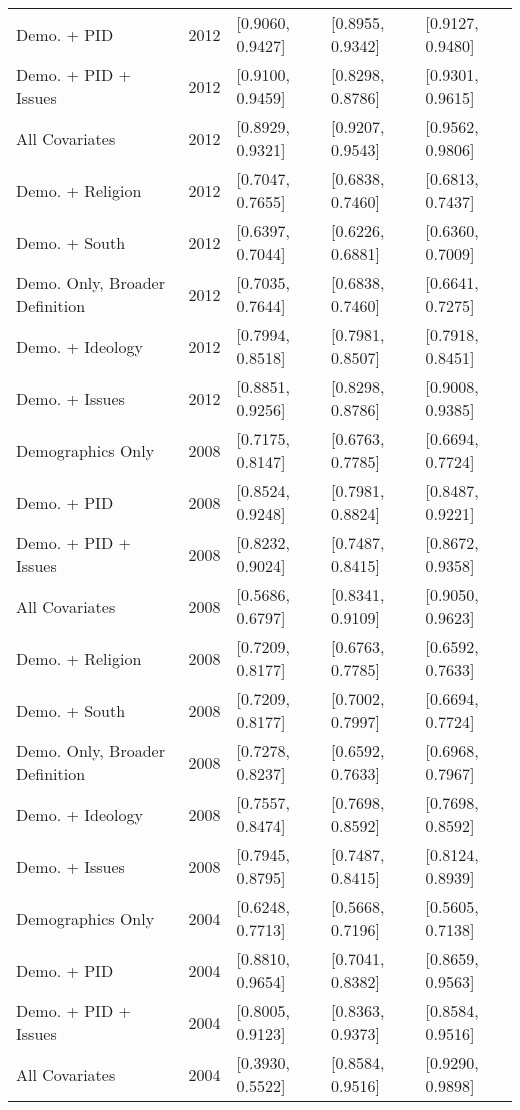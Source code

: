 \begin{longtable}{lrlll}
  Demo. + PID & 2012 & [0.9060, 0.9427] & [0.8955, 0.9342] & [0.9127, 0.9480] \\ 
  Demo. + PID + Issues & 2012 & [0.9100, 0.9459] & [0.8298, 0.8786] & [0.9301, 0.9615] \\ 
  All Covariates & 2012 & [0.8929, 0.9321] & [0.9207, 0.9543] & [0.9562, 0.9806] \\ 
  Demo. + Religion & 2012 & [0.7047, 0.7655] & [0.6838, 0.7460] & [0.6813, 0.7437] \\ 
  Demo. + South & 2012 & [0.6397, 0.7044] & [0.6226, 0.6881] & [0.6360, 0.7009] \\ 
  Demo. Only, Broader Definition & 2012 & [0.7035, 0.7644] & [0.6838, 0.7460] & [0.6641, 0.7275] \\ 
  Demo. + Ideology & 2012 & [0.7994, 0.8518] & [0.7981, 0.8507] & [0.7918, 0.8451] \\ 
  Demo. + Issues & 2012 & [0.8851, 0.9256] & [0.8298, 0.8786] & [0.9008, 0.9385] \\ 
  Demographics Only & 2008 & [0.7175, 0.8147] & [0.6763, 0.7785] & [0.6694, 0.7724] \\ 
  Demo. + PID & 2008 & [0.8524, 0.9248] & [0.7981, 0.8824] & [0.8487, 0.9221] \\ 
  Demo. + PID + Issues & 2008 & [0.8232, 0.9024] & [0.7487, 0.8415] & [0.8672, 0.9358] \\ 
  All Covariates & 2008 & [0.5686, 0.6797] & [0.8341, 0.9109] & [0.9050, 0.9623] \\ 
  Demo. + Religion & 2008 & [0.7209, 0.8177] & [0.6763, 0.7785] & [0.6592, 0.7633] \\ 
  Demo. + South & 2008 & [0.7209, 0.8177] & [0.7002, 0.7997] & [0.6694, 0.7724] \\ 
  Demo. Only, Broader Definition & 2008 & [0.7278, 0.8237] & [0.6592, 0.7633] & [0.6968, 0.7967] \\ 
  Demo. + Ideology & 2008 & [0.7557, 0.8474] & [0.7698, 0.8592] & [0.7698, 0.8592] \\ 
  Demo. + Issues & 2008 & [0.7945, 0.8795] & [0.7487, 0.8415] & [0.8124, 0.8939] \\ 
  Demographics Only & 2004 & [0.6248, 0.7713] & [0.5668, 0.7196] & [0.5605, 0.7138] \\ 
  Demo. + PID & 2004 & [0.8810, 0.9654] & [0.7041, 0.8382] & [0.8659, 0.9563] \\ 
  Demo. + PID + Issues & 2004 & [0.8005, 0.9123] & [0.8363, 0.9373] & [0.8584, 0.9516] \\ 
  All Covariates & 2004 & [0.3930, 0.5522] & [0.8584, 0.9516] & [0.9290, 0.9898] \\ 

\end{longtable}
